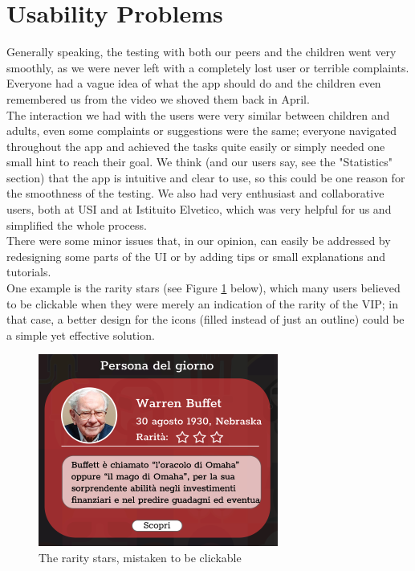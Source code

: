 \documentclass[12pt]{scrartcl}
\begin{document}
	\newpage

\section{Usability Problems}

	
	Generally speaking, the testing with both our peers and the children went very smoothly, as we were never left with a completely lost user or terrible complaints. Everyone had a vague idea of what the app should do and the children even remembered us from the video we shoved them back in April.\\
	
	The interaction we had with the users were very similar between children and adults, even some complaints or suggestions were the same; everyone navigated throughout the app and achieved the tasks quite easily or simply needed one small hint to reach their goal. We think (and our users say, see the "Statistics" section) that the app is intuitive and clear to use, so this could be one reason for the smoothness of the testing. We also had very enthusiast and collaborative users, both at USI and at Istituito Elvetico, which was very helpful for us and simplified the whole process.\\
	
	There were some minor issues that, in our opinion, can easily be addressed by redesigning some parts of the UI or by adding tips or small explanations and tutorials.\\
	One example is the rarity stars (see Figure \ref{stars} below), which many users believed to be clickable when they were merely an indication of the rarity of the VIP; in that case, a better design for the icons (filled instead of just an outline) could be a simple yet effective solution.\\
	
	\begin{figure}[H]
		\centering
		\includegraphics{../images/GA6_Stars.png}
		\caption{The rarity stars, mistaken to be clickable}
		\label{stars}
	\end{figure}
	
\end{document}
